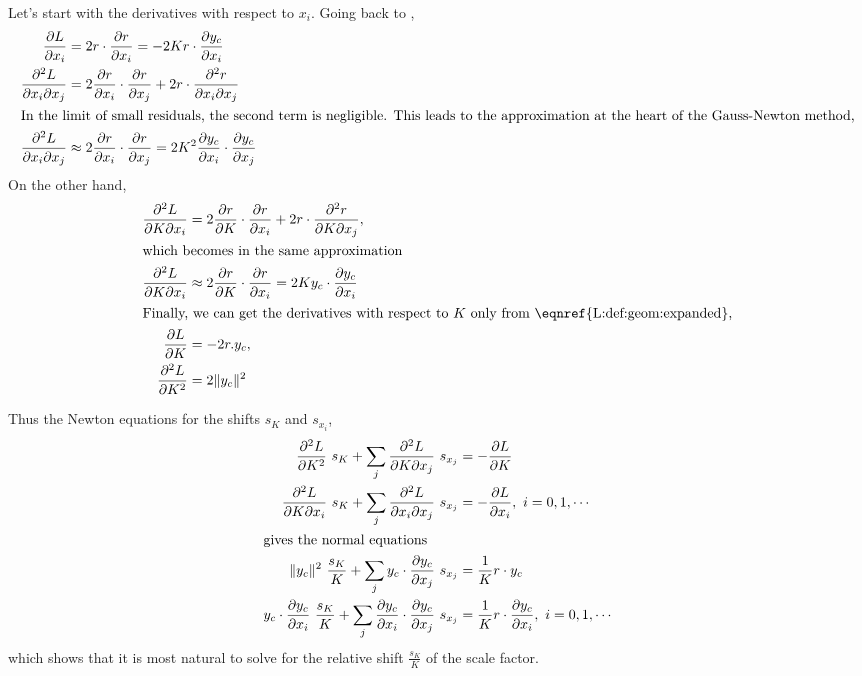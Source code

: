 \documentclass[11pt]{article}
\begin{document}
Let's start with the derivatives with respect to $x_i$. Going back to ,
\begin{align}
\frac{\partial L}{\partial x_i} &= 2 r \cdot \frac{\partial r}{\partial x_i} = -2K r \cdot \frac{\partial y_c}{\partial x_i}\\
\frac{\partial^2 L}{\partial x_i \partial x_j} &= 2 \frac{\partial r}{\partial x_i} \cdot \frac{\partial r}{\partial x_j} + 2 r \cdot \frac{\partial^2 r}{\partial x_i \partial x_j}
\label{eqn:der:xi:xj}
\\
\intertext{In the limit of small residuals, the second term is negligible. This leads to the approximation at the heart of the Gauss-Newton method,}
\frac{\partial^2 L}{\partial x_i \partial x_j} &\approx 2 \frac{\partial r}{\partial x_i} \cdot \frac{\partial r}{\partial x_j} = 2K^2 \frac{\partial y_c}{\partial x_i} \cdot \frac{\partial y_c}{\partial x_j}
\end{align}
On the other hand,
\begin{align}
\partialderxy{L}{K}{x_i} &= 2 \partialder{r}{K} \cdot \partialder{r}{x_i} + 2 r \cdot \partialderxy{r}{K}{x_j} ,\\
\intertext{which becomes in the same approximation}
\partialderxy{L}{K}{x_i} &\approx 2 \partialder{r}{K} \cdot \partialder{r}{x_i} = 2K y_c \cdot \partialder{y_c}{x_i}
\label{eqn:der:xi:K}
\\
\intertext{Finally, we can get the derivatives with respect to $K$ only from \eqnref{L:def:geom:expanded},}
\partialder{L}{K} &= -2 r.y_c,\\
\partialderxx{L}{K} &= 2\|y_c\|^2
\end{align}

Thus the Newton equations for the shifts $s_K$ and $s_{x_i}$,
\begin{align}
\partialderxx{L}{K}\ s_K + \sum_j \partialderxy{L}{K}{x_j}\ s_{x_j} &= -\partialder{L}{K}\\
\partialderxy{L}{K}{x_i}\ s_K + \sum_j \partialderxy{L}{x_i}{x_j}\ s_{x_j} &= -\partialder{L}{x_i},\ i=0,1,\cdots\\
\intertext{gives the normal equations}
\| y_c \|^2\ \dfrac{s_K}{K}
+ \sum_j y_c \cdot \partialder{y_c}{x_j}\ s_{x_j}
&= \frac{1}{K} r \cdot  y_c\\
y_c \cdot \partialder{y_c}{x_i}\ \dfrac{s_K}{K}
+ \sum_j \partialder{y_c}{x_i} \cdot \partialder{y_c}{x_j}\ s_{x_j}
&= \frac{1}{K} r \cdot \partialder{y_c}{x_i},\ i=0,1,\cdots
\end{align}
which shows that it is most natural to solve for the relative shift $\frac{s_K}{K}$ of the scale factor.


\end{document}
